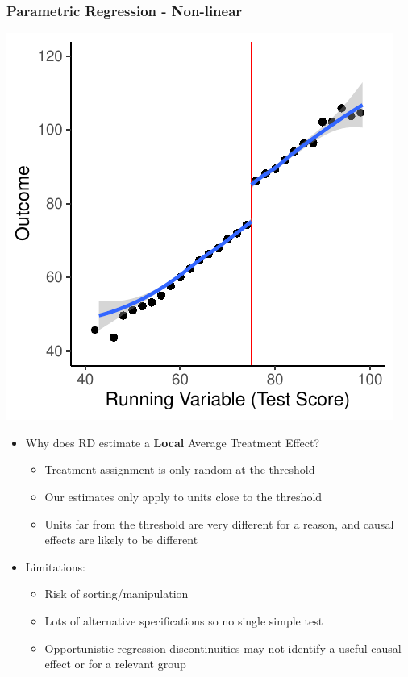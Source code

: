 \documentclass[xcolor=x11names,compress]{beamer}\usepackage[]{graphicx}\usepackage[]{color}
\makeatletter
\def\maxwidth{ %
  \ifdim\Gin@nat@width>\linewidth
    \linewidth
  \else
    \Gin@nat@width
  \fi
}
\newenvironment{knitrout}{}{} %
\renewcommand{\(}{\begin{columns}}
\renewcommand{\)}{\end{columns}}
\newcommand{\<}[1]{\begin{column}{#1}}
\renewcommand{\>}{\end{column}}
\makeatother
\begin{document}
\begin{frame}
\frametitle{Parametric Regression - Non-linear}
\begin{center}
\begin{knitrout}
\color{fgcolor}
\includegraphics[width=\maxwidth]{figure/chart5-1} 

\end{knitrout}
\end{center}
\end{frame}

\begin{frame}
\begin{itemize}
\item Why does RD estimate a \textbf{Local} Average Treatment Effect?
\pause
\begin{itemize}
\item Treatment assignment is only random at the threshold
\pause
\item Our estimates only apply to units close to the threshold
\pause
\item Units far from the threshold are very different for a reason, and causal effects are likely to be different
\end{itemize}
\end{itemize}
\end{frame}


\begin{frame}
\begin{itemize}
\item Limitations:
\begin{itemize}
\item Risk of sorting/manipulation
\pause
\item Lots of alternative specifications so no single simple test
\pause
\item Opportunistic regression discontinuities may not identify a useful causal effect or for a relevant group
\pause
\end{itemize}
\end{itemize}
\end{frame}
\end{document}
